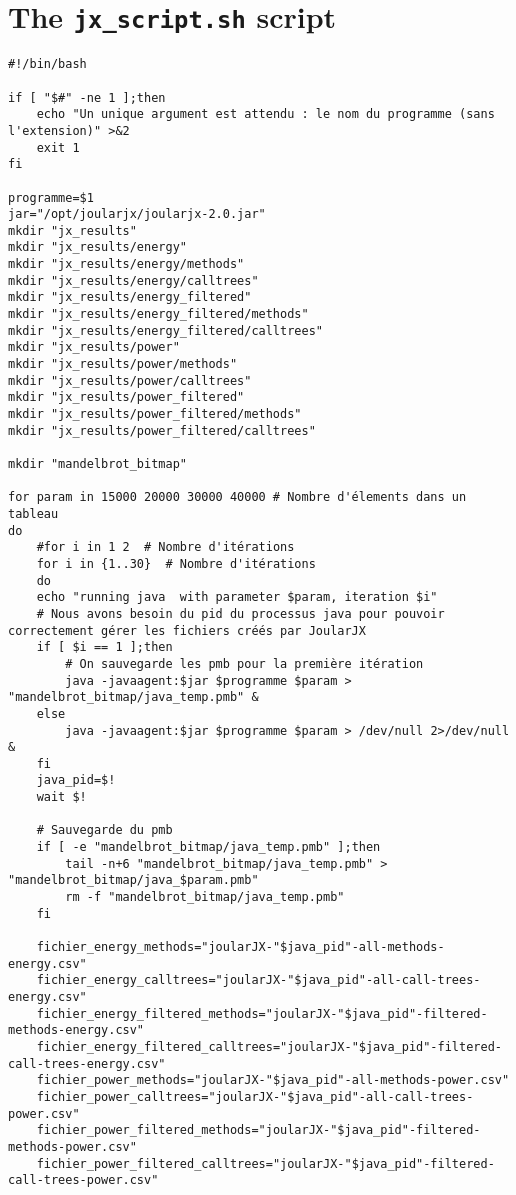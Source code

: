 \section{The \texttt{jx\_script.sh} script}\label{sec:mainscript}

\begin{lstlisting}
#!/bin/bash

if [ "$#" -ne 1 ];then
    echo "Un unique argument est attendu : le nom du programme (sans l'extension)" >&2
    exit 1
fi

programme=$1
jar="/opt/joularjx/joularjx-2.0.jar"
mkdir "jx_results"
mkdir "jx_results/energy"
mkdir "jx_results/energy/methods"
mkdir "jx_results/energy/calltrees"
mkdir "jx_results/energy_filtered"
mkdir "jx_results/energy_filtered/methods"
mkdir "jx_results/energy_filtered/calltrees"
mkdir "jx_results/power"
mkdir "jx_results/power/methods"
mkdir "jx_results/power/calltrees"
mkdir "jx_results/power_filtered"
mkdir "jx_results/power_filtered/methods"
mkdir "jx_results/power_filtered/calltrees"

mkdir "mandelbrot_bitmap"

for param in 15000 20000 30000 40000 # Nombre d'élements dans un tableau
do    
    #for i in 1 2  # Nombre d'itérations
    for i in {1..30}  # Nombre d'itérations
    do 
	echo "running java  with parameter $param, iteration $i"
	# Nous avons besoin du pid du processus java pour pouvoir correctement gérer les fichiers créés par JoularJX
	if [ $i == 1 ];then
	    # On sauvegarde les pmb pour la première itération
	    java -javaagent:$jar $programme $param > "mandelbrot_bitmap/java_temp.pmb" &
	else
	    java -javaagent:$jar $programme $param > /dev/null 2>/dev/null &
	fi
	java_pid=$!
	wait $!

	# Sauvegarde du pmb
	if [ -e "mandelbrot_bitmap/java_temp.pmb" ];then
	    tail -n+6 "mandelbrot_bitmap/java_temp.pmb" > "mandelbrot_bitmap/java_$param.pmb"
	    rm -f "mandelbrot_bitmap/java_temp.pmb"
	fi
	
	fichier_energy_methods="joularJX-"$java_pid"-all-methods-energy.csv"
	fichier_energy_calltrees="joularJX-"$java_pid"-all-call-trees-energy.csv"
	fichier_energy_filtered_methods="joularJX-"$java_pid"-filtered-methods-energy.csv"
	fichier_energy_filtered_calltrees="joularJX-"$java_pid"-filtered-call-trees-energy.csv"
	fichier_power_methods="joularJX-"$java_pid"-all-methods-power.csv"
	fichier_power_calltrees="joularJX-"$java_pid"-all-call-trees-power.csv"
	fichier_power_filtered_methods="joularJX-"$java_pid"-filtered-methods-power.csv"
	fichier_power_filtered_calltrees="joularJX-"$java_pid"-filtered-call-trees-power.csv"


\end{lstlisting}
